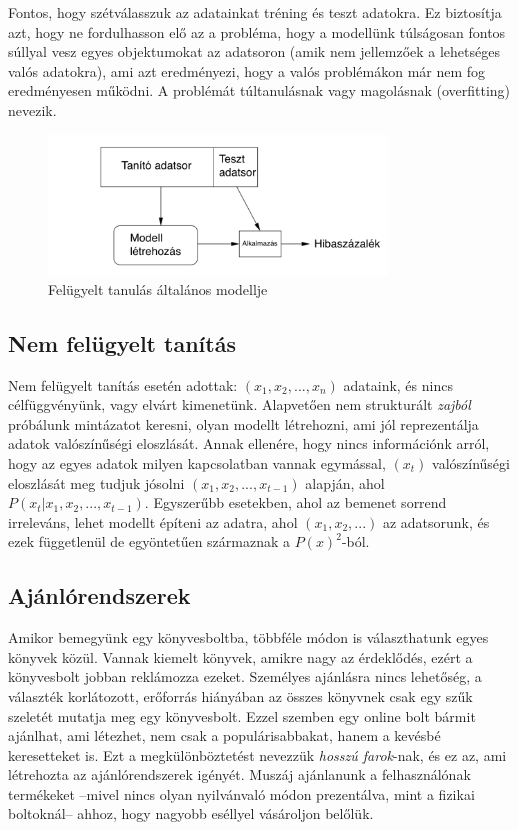 \documentclass[a4paper,12pt]{article}
\begin{document}
Fontos, hogy szétválasszuk az adatainkat tréning és teszt adatokra. Ez biztosítja azt, hogy ne fordulhasson elő az a probléma, hogy a modellünk túlságosan fontos súllyal vesz egyes objektumokat az adatsoron (amik nem jellemzőek a lehetséges valós adatokra), ami azt eredményezi, hogy a valós problémákon már nem fog eredményesen működni. A problémát túltanulásnak vagy magolásnak (overfitting) nevezik. \cite{overfit}


\begin{figure}[ht!]
\centering
\includegraphics[width=90mm]{img/ml.png}
\caption{Felügyelt tanulás általános modellje \cite{UlmannSupervised} \label{ml}}
\end{figure}

\subsection{Nem felügyelt tanítás}
Nem felügyelt tanítás esetén adottak: $(x_1, x_2, ..., x_n)$ adataink, és nincs célfüggvényünk, vagy elvárt kimenetünk. Alapvetően nem strukturált \textsl{zajból} próbálunk mintázatot keresni, olyan modellt létrehozni, ami jól reprezentálja adatok valószínűségi eloszlását. Annak ellenére, hogy nincs információnk arról, hogy az egyes adatok milyen kapcsolatban vannak egymással, $(x_t)$ valószínűségi eloszlását meg tudjuk jósolni  $(x_1,x_2, ..., x_{t-1})$ alapján, ahol $P(x_t|x_1,x_2, ..., x_{t-1})$.
Egyszerűbb esetekben, ahol az bemenet sorrend irreleváns, lehet modellt építeni az adatra, ahol $(x_1, x_2, ...)$ az adatsorunk, és ezek függetlenül de egyöntetűen származnak a $P(x)^2$-ból.\cite{unsupervised}

\subsection{Ajánlórendszerek}
Amikor bemegyünk egy könyvesboltba, többféle módon is választhatunk egyes könyvek közül. Vannak kiemelt könyvek, amikre nagy az érdeklődés, ezért a könyvesbolt jobban reklámozza ezeket. Személyes ajánlásra nincs lehetőség, a választék korlátozott, erőforrás hiányában az összes könyvnek csak egy szűk szeletét mutatja meg egy könyvesbolt. Ezzel szemben egy online bolt bármit ajánlhat, ami létezhet, nem csak a populárisabbakat, hanem a kevésbé keresetteket is. Ezt a megkülönböztetést nevezzük \textsl{hosszú farok}-nak\cite{longtail}, és ez az, ami létrehozta az ajánlórendszerek igényét. Muszáj ajánlanunk a felhasználónak termékeket --mivel nincs olyan nyilvánvaló módon prezentálva, mint a fizikai boltoknál-- ahhoz, hogy nagyobb eséllyel vásároljon belőlük. \newline
\end{document}

